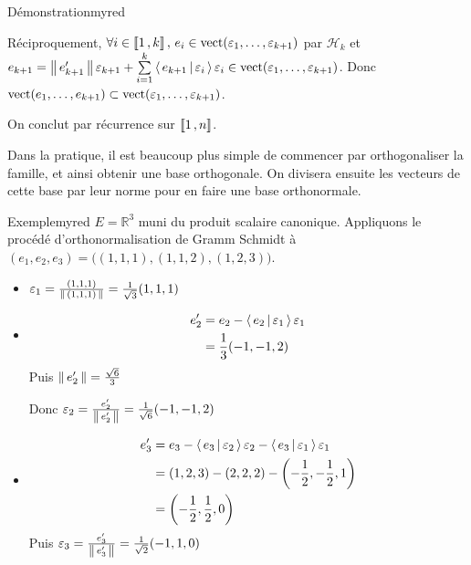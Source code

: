 \begin{demo}{Démonstration}{myred}
\begin{itemize}
                Réciproquement, $\forall i \in \left\llbracket 1 \, , k \right\rrbracket, \, e_i \in \operatorname{vect}(\varepsilon_1,\ldots,\varepsilon_{k+1})$ par $\mathcal{H}_k$ et $e_{k+1} = \left\lVert \,e_{k+1}' \, \right\rVert \varepsilon_{k+1} + \sum\limits_{i=1}^k \left<\,e_{k+1}\,\middle|\,\varepsilon_i\,\right>\varepsilon_i  \in \operatorname{vect}(\varepsilon_1,\ldots,\varepsilon_{k+1})$. Donc $\operatorname{vect}(e_1,\ldots,e_{k+1}) \subset \operatorname{vect}(\varepsilon_1,\ldots,\varepsilon_{k+1})$.
            \end{itemize}
            On conclut par récurrence sur $\left\llbracket 1 \, , n \right\rrbracket$.
        \end{demo}

        Dans la pratique, il est beaucoup plus simple de commencer par orthogonaliser la famille, et ainsi obtenir une base orthogonale. On divisera ensuite les vecteurs de cette base par leur norme pour en faire une base orthonormale.
    
        \begin{omed}{Exemple}{myred}
            $E = \mathbb{R}^3$ muni du produit scalaire canonique. Appliquons le procédé d’orthonormalisation de Gramm Schmidt à $(e_1,e_2,e_3) = \big((1,1,1),(1,1,2),(1,2,3)\big)$.
            \begin{itemize}
                \item $\varepsilon_1 = \frac{(1,1,1)}{\left\lVert \,(1,1,1) \, \right\rVert} = \frac{1}{\sqrt{3}} (1,1,1)$
                \item \begin{align*}
                    e_2' &= e_2 - \left<\,e_2\,\middle|\,\varepsilon_1\,\right>\varepsilon_1 \\
                    &= \frac{1}{3}(-1,-1,2)
                \end{align*}
                Puis $\left\lVert \,e_2' \, \right\rVert = \frac{\sqrt{6}}{3}$ 
                
                Donc $\varepsilon_2 = \frac{e_2'}{\left\lVert \,e_2' \, \right\rVert} = \frac{1}{\sqrt{6}}(-1,-1,2)$
                \item \begin{align*}
                    e_3' &= e_3 - \left<\,e_3\,\middle|\,\varepsilon_2\,\right>\varepsilon_2 - \left<\,e_3\,\middle|\,\varepsilon_1\,\right>\varepsilon_1 \\
                    &= (1,2,3) - (2,2,2) - \left(-\frac{1}{2}, -\frac{1}{2}, 1\right) \\
                    &= \left(-\frac{1}{2}, \frac{1}{2},0\right)
                \end{align*}
                Puis $\varepsilon_3 = \frac{e_3'}{\left\lVert \,e_3' \, \right\rVert} = \frac{1}{\sqrt{2}}(-1,1,0)$
            \end{itemize}
        \end{omed}

